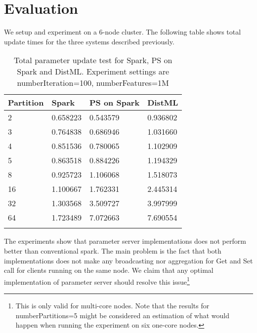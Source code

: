 \section*{Evaluation}
\label{sec:evaluation}

We setup and experiment on a 6-node cluster. The following table shows total update times for the three systems described previously.

\begin{longtable}{m{3cm} m{3cm} m{3cm} m{3cm} }
\hline
Partition & Spark & PS on Spark & DistML \\
\hline
\rowcolor[gray]{0.9}
2 & 0.658223 & 0.543579 & 0.936802 \\
3 & 0.764838 & 0.686946 & 1.031660 \\
\rowcolor[gray]{0.9}
4 & 0.851536 & 0.780065 & 1.102909 \\
5 & 0.863518 & 0.884226 & 1.194329 \\
\rowcolor[gray]{0.9}
8 & 0.925723 & 1.106068 & 1.518073 \\
16 & 1.100667 & 1.762331 & 2.445314 \\
\rowcolor[gray]{0.9}
32 & 1.303568 & 3.509727 & 3.997999 \\
64 & 1.723489 & 7.072663 & 7.690554 \\
\hline
\caption{Total parameter update test for Spark, PS on Spark and DistML. Experiment settings are numberIteration=100, numberFeatures=1M}
\label{table:evaluation}
\end{longtable}

The experiments show that parameter server implementations does not perform better than conventional spark. The main problem is the fact that both implementations does not make any broadcasting nor aggregation for Get and Set call for clients running on the same node. We claim that any optimal implementation of parameter server should resolve this issue\footnote{This is only valid for multi-core nodes. Note that the results for numberPartitions=5 might be considered an estimation of what would happen when running the experiment on six one-core nodes.}

